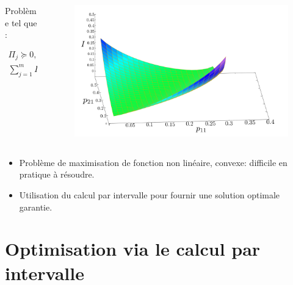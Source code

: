 \documentclass{beamer}
\begin{document}
\begin{frame}
{\begin{columns}
\begin{column}{0.5\textwidth}
\begin{block}{Problème}
                    tel que :
        
                    \begin{align}
                        \Pi_j \succeq 0, \quad 1 \leq j \leq m \label{eq:contrainte_sdp} \\
                        \displaystyle \sum_{j=1}^{m} \Pi_j = I \label{eq:contrainte_somme_id}
                    \end{align}
                \end{block}
            \end{column}
            \begin{column}{0.5\textwidth}
                \begin{figure}[H]
                    \centering
                    \includegraphics[scale=0.13]{images/MI_convex.png}
                    \caption{}
                    \label{fig:mi_convex}
                \end{figure}
            \end{column}
        \end{columns}


        \begin{itemize}
            \item Problème de maximisation de fonction non linéaire, convexe: difficile en pratique à résoudre.
            \item Utilisation du calcul par intervalle pour fournir une solution optimale garantie.
        \end{itemize}
    }
\end{frame}

\section[2. Calcul par intervalles]{Optimisation via le calcul par intervalle}
\end{document}
